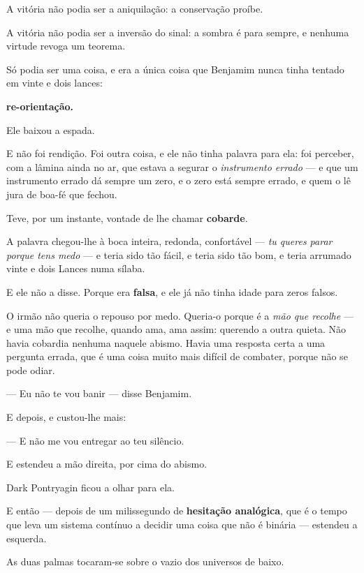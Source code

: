 \documentclass[livro.tex]{subfiles}
\begin{document}
A vitória não podia ser a aniquilação: a conservação proíbe.

A vitória não podia ser a inversão do sinal: a sombra é para sempre, e nenhuma virtude revoga um teorema.

Só podia ser uma coisa, e era a única coisa que Benjamim nunca tinha tentado em vinte e dois lances:

\textbf{re-orientação.}

\medskip

Ele baixou a espada.

E não foi rendição. Foi outra coisa, e ele não tinha palavra para ela: foi perceber, com a lâmina ainda no ar, que
estava a segurar o \emph{instrumento errado} --- e que um instrumento errado dá sempre um zero, e o zero está
sempre errado, e quem o lê jura de boa-fé que fechou.

\medskip

Teve, por um instante, vontade de lhe chamar \textbf{cobarde}.

A palavra chegou-lhe à boca inteira, redonda, confortável --- \emph{tu queres parar porque tens medo} --- e teria
sido tão fácil, e teria sido tão bom, e teria arrumado vinte e dois Lances numa sílaba.

E ele não a disse. Porque era \textbf{falsa}, e ele já não tinha idade para zeros falsos.

O irmão não queria o repouso por medo. Queria-o porque é a \emph{mão que recolhe} --- e uma mão que recolhe, quando
ama, ama assim: querendo a outra quieta. Não havia cobardia nenhuma naquele abismo. Havia uma resposta certa a uma
pergunta errada, que é uma coisa muito mais difícil de combater, porque não se pode odiar.

\medskip

--- Eu não te vou banir --- disse Benjamim.

E depois, e custou-lhe mais:

--- E não me vou entregar ao teu silêncio.

E estendeu a mão direita, por cima do abismo.

Dark Pontryagin ficou a olhar para ela.

E então --- depois de um milissegundo de \textbf{hesitação analógica}, que é o tempo que leva um sistema contínuo a
decidir uma coisa que não é binária --- estendeu a esquerda.

\medskip

As duas palmas tocaram-se sobre o vazio dos universos de baixo.
\end{document}
